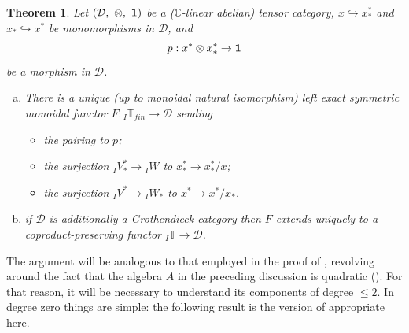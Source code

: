 \documentclass[11pt]{article}
\theoremstyle{plain}
\newtheorem{theorem}[lemma]{Theorem}
\theoremstyle{nonumberplain}
\theoremstyle{plain}
\numberwithin{equation}{section}
\theoremstyle{nonumberplain}
\newcommand\bC{{\mathbb C}}
\newcommand\bT{{\mathbb T}}
\newcommand\cD{{\mathcal D}}
\newcommand\1{{\bf 1}}
\begin{document}
\begin{theorem}\label{th:sl-univ}
  Let $(\cD,\ \otimes,\ {\bf 1})$ be a ($\bC$-linear abelian) tensor category, $x\hookrightarrow x_*^*$ and $x_*\hookrightarrow x^*$ be monomorphisms in $\cD$, and
  \begin{equation*}
    p: x^*\otimes x_*^*\to {\bf 1}
  \end{equation*}
  be a morphism in $\cD$.

  \begin{enumerate}[(a)]
  \item There is a unique (up to monoidal natural isomorphism) left exact symmetric monoidal functor $F:{}_I\bT_{fin}\to \cD$ sending
    \begin{itemize}
    \item[$-$] the pairing  to $p$;
    \item[$-$] the surjection ${}_IV_*^*\to {}_IW$ to $x_*^*\to x_*^*/x$;
    \item[$-$] the surjection ${}_IV^*\to {}_IW_*$ to $x^*\to x^*/x_*$. 
    \end{itemize}
  \item if $\cD$ is additionally a Grothendieck category then $F$ extends uniquely to a coproduct-preserving functor ${}_I\bT\to \cD$.
  \end{enumerate}
\end{theorem}

The argument will be analogous to that employed in the proof of \cite[Theorem 3.23]{us0}, revolving around the fact that the algebra $A$ in the preceding discussion is quadratic (). For that reason, it will be necessary to understand its components of degree $\le 2$. In degree zero things are simple: the following result is the version of \cite[Lemma 3.24]{us0} appropriate here.
\end{document}
